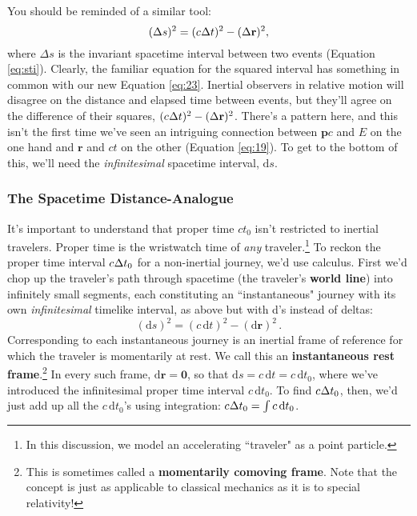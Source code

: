 \documentclass[12pt]{article}
\renewcommand{\vv}[1]{\mathbf{#1}}
\newcommand{\dd}[1]{\mathrm{d}#1}
\begin{document}
You should be reminded of a similar tool:
\begin{equation*}
(\Delta s)^2 = (c \mkern.5mu \Delta t)^2 - (\Delta \vv r)^2,
\end{equation*}
where $\Delta s$ is the invariant spacetime interval between two events (Equation \ref{eq:sti}). Clearly, the familiar equation for the squared interval has something in common with our new Equation \ref{eq:23}. Inertial observers in relative motion will disagree on the distance and elapsed time between events, but they'll agree on the difference of their squares, $(c \mkern.5mu \Delta t)^2 - (\Delta \vv r)^2$. There's a pattern here, and this isn't the first time we've seen an intriguing connection between $\vv p c$ and $E$ on the one hand and $\vv r$ and $ct$ on the other (Equation \ref{eq:19}). To get to the bottom of this, we'll need the \emph{infinitesimal} spacetime interval, $\dd s$.

\subsubsection{The Spacetime Distance-Analogue}\label{sssec:ds}

It's important to understand that proper time $ct_0$ isn't restricted to inertial travelers. Proper time is the wristwatch time of \emph{any} traveler.\footnote{\label{fn:tr}In this discussion, we model an accelerating ``traveler" as a point particle.} To reckon the proper time interval $c \mkern.5mu \Delta t_0$ for a non-inertial journey, we'd use calculus. First we'd chop up the traveler's path through spacetime (the traveler's \textbf{world line}) into infinitely small segments, each constituting an ``instantaneous" journey with its own \emph{infinitesimal} timelike interval, as above but with d's instead of deltas:
\begin{equation}\label{eq:24}
\boxed{(\dd s)^2 =(c \, \dd t)^2 - (\dd \vv r)^2} \, .
\end{equation}
Corresponding to each instantaneous journey is an inertial frame of reference for which the traveler is momentarily at rest. We call this an \textbf{instantaneous rest frame}.\footnote{This is sometimes called a \textbf{momentarily comoving frame}. Note that the concept is just as applicable to classical mechanics as it is to special relativity!} In every such frame, $\dd \vv r = \vv 0$, so that $\dd s = c \,\dd t = c \, \dd t_0$, where we've introduced the infinitesimal proper time interval $c \, \dd t_0$. To find $c \mkern.5mu \Delta t_0$, then, we'd just add up all the $c \, \dd t_0$'s using integration: $c \mkern.5mu \Delta t_0 = \int c \, \dd t_0$.
\end{document}

